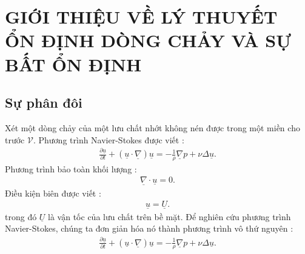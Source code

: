 \documentclass[CO_LUU_CHAT_NC.tex]{subfiles}
\begin{document}
\chapter{GIỚI THIỆU VỀ LÝ THUYẾT ỔN ĐỊNH DÒNG CHẢY VÀ SỰ BẤT ỔN ĐỊNH}
\section{Sự phân đôi}
Xét một dòng chảy của một lưu chất nhớt không nén được trong một miền cho trước $\mathcal{V}$. Phương trình Navier-Stokes được viết :
\begin{equation}
    \begin{aligned}
        \frac{\partial\underline{u}}{\partial t}+\left(\underline{u}\cdot\underline{\nabla}\right)\underline{u}=-\frac{1}{\rho}\underline{\nabla}p+\nu\Delta\underline{u}.
    \end{aligned}
\end{equation}
Phương trình bảo toàn khối lượng :
\begin{equation}
    \begin{aligned}
        \underline{\nabla}\cdot\underline{u}=0.
    \end{aligned}
\end{equation}
Điều kiện biên được viết :
\begin{equation}
    \begin{aligned}
       \underline{u}=\underline{U}.
    \end{aligned}
\end{equation}
trong đó $\underline{U}$ là vận tốc của lưu chất trên bề mặt. Để nghiên cứu phương trình Navier-Stokes, chúng ta đơn giản hóa nó thành phương trình vô thứ nguyên :
\begin{equation}
    \begin{aligned}
        \frac{\partial\underline{u}}{\partial t}+\left(\underline{u}\cdot\underline{\nabla}\right)\underline{u}=-\frac{1}{\rho}\underline{\nabla}p+\nu\Delta\underline{u}.
    \end{aligned}
\end{equation}
\end{document}

